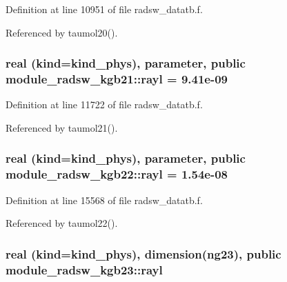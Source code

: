 Definition at line 10951 of file radsw\+\_\+datatb.\+f.



Referenced by taumol20().

\subsubsection[{\texorpdfstring{rayl}{rayl}}]{\setlength{\rightskip}{0pt plus 5cm}real (kind=kind\+\_\+phys), parameter, public module\+\_\+radsw\+\_\+kgb21\+::rayl = 9.\+41e-\/09}\hypertarget{group__module__radsw__main_ga8df418599fb8aef5fc8f2935a913b361}{}\label{group__module__radsw__main_ga8df418599fb8aef5fc8f2935a913b361}


Definition at line 11722 of file radsw\+\_\+datatb.\+f.



Referenced by taumol21().

\subsubsection[{\texorpdfstring{rayl}{rayl}}]{\setlength{\rightskip}{0pt plus 5cm}real (kind=kind\+\_\+phys), parameter, public module\+\_\+radsw\+\_\+kgb22\+::rayl = 1.\+54e-\/08}\hypertarget{group__module__radsw__main_gae77b766677ea476e2ba14b88e511870a}{}\label{group__module__radsw__main_gae77b766677ea476e2ba14b88e511870a}


Definition at line 15568 of file radsw\+\_\+datatb.\+f.



Referenced by taumol22().

\subsubsection[{\texorpdfstring{rayl}{rayl}}]{\setlength{\rightskip}{0pt plus 5cm}real (kind=kind\+\_\+phys), dimension(ng23), public module\+\_\+radsw\+\_\+kgb23\+::rayl}\hypertarget{group__module__radsw__main_ga40006f284543c7347eced417b9de2fc6}{}\label{group__module__radsw__main_ga40006f284543c7347eced417b9de2fc6}


